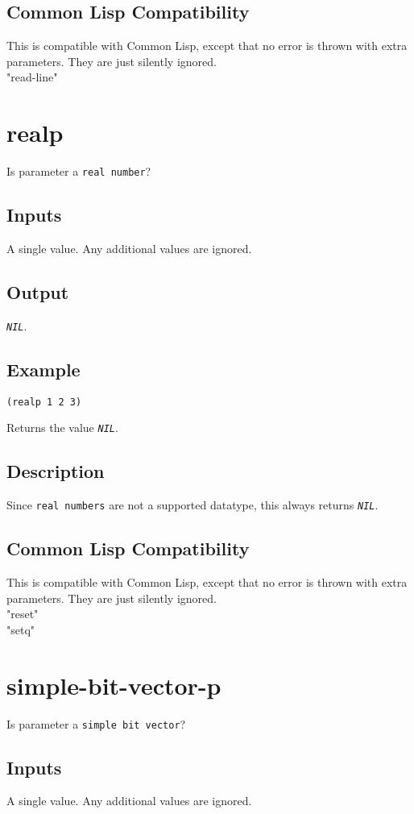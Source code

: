 \documentclass[10pt, openany]{book}
\newcommand{\constant}[1]{\emph{\texttt{#1}}}
\newcommand{\datatype}[1]{\texttt{#1}}
\newcommand{\cl}{Common Lisp}
\begin{document}
\subsection{Common Lisp Compatibility}
This is compatible with \cl, except that no error is thrown with extra parameters.  They are just silently ignored.
\\
      "read-line"\\

\section{realp}
Is parameter a \datatype{real number}?
\subsection{Inputs}
A single value.  Any additional values are ignored.
\subsection{Output}
\constant{NIL}.
\subsection{Example}
\begin{lstlisting}
(realp 1 2 3)
\end{lstlisting}
Returns the value \constant{NIL}.
\subsection{Description}
Since \datatype{real numbers} are not a supported datatype, this always returns \constant{NIL}.
\subsection{Common Lisp Compatibility}
This is compatible with \cl, except that no error is thrown with extra parameters.  They are just silently ignored.
\\
      "reset"\\
      "setq"\\

\section{simple-bit-vector-p}
Is parameter a \datatype{simple bit vector}?
\subsection{Inputs}
A single value.  Any additional values are ignored.
\end{document}
